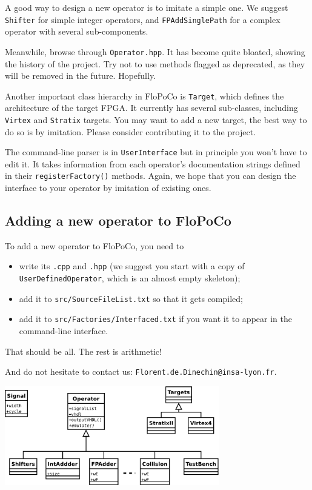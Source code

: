 \documentclass{article}
\begin{document}
A good way to design a new operator is to imitate a simple one. We suggest
\texttt{Shifter} for simple integer operators, and \texttt{FPAddSinglePath}
for a complex operator with several sub-components.

Meanwhile, browse through \texttt{Operator.hpp}. It has become quite bloated, showing
the history of the project. Try not to use methods flagged as
deprecated, as they will be removed in the future. Hopefully.%

Another important class hierarchy in FloPoCo is \texttt{Target}, which
defines the architecture of the target FPGA. It currently has several sub-classes,
including \texttt{Virtex} and \texttt{Stratix} targets. You may want to
add a new target, the best way to do so is by imitation. Please
consider contributing it to the project.

The command-line parser is in \texttt{UserInterface} but in principle you won't have to edit it.
It takes information from each operator's documentation strings defined in their \texttt{registerFactory()} methods. 
Again, we hope that you can design the interface to your operator by imitation of existing ones.

\subsection{Adding a new operator to FloPoCo}
To add a new operator to FloPoCo, you need to 
\begin{itemize}
\item write its \texttt{.cpp} and \texttt{.hpp} (we suggest you start with a copy of  \texttt{UserDefinedOperator}, which is an almost empty skeleton);
\item add it to \texttt{src/SourceFileList.txt} so that it gets compiled;
\item add it to \texttt{src/Factories/Interfaced.txt} if you want it to appear in the command-line interface.
\end{itemize}

That should be all. The rest is arithmetic!

And do not hesitate to contact us: \texttt{Florent.de.Dinechin@insa-lyon.fr}.

\begin{center}
  \includegraphics[width=0.7\textwidth]{../Figures/FloPoCoClasses.pdf}        
\end{center}
\end{document}
